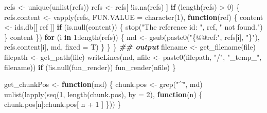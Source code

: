 \documentclass[
]{article}
\newenvironment{Shaded}{\begin{snugshade}}{\end{snugshade}}
\newcommand{\AttributeTok}[1]{\textcolor[rgb]{0.77,0.63,0.00}{#1}}
\newcommand{\ControlFlowTok}[1]{\textcolor[rgb]{0.13,0.29,0.53}{\textbf{#1}}}
\newcommand{\DecValTok}[1]{\textcolor[rgb]{0.00,0.00,0.81}{#1}}
\newcommand{\DocumentationTok}[1]{\textcolor[rgb]{0.56,0.35,0.01}{\textbf{\textit{#1}}}}
\newcommand{\FunctionTok}[1]{\textcolor[rgb]{0.00,0.00,0.00}{#1}}
\newcommand{\NormalTok}[1]{#1}
\newcommand{\OtherTok}[1]{\textcolor[rgb]{0.56,0.35,0.01}{#1}}
\newcommand{\SpecialCharTok}[1]{\textcolor[rgb]{0.00,0.00,0.00}{#1}}
\newcommand{\StringTok}[1]{\textcolor[rgb]{0.31,0.60,0.02}{#1}}
\begin{document}
\begin{Shaded}
\begin{Highlighting}[]
\NormalTok{    refs }\OtherTok{\textless{}{-}} \FunctionTok{unique}\NormalTok{(}\FunctionTok{unlist}\NormalTok{(refs))}
\NormalTok{    refs }\OtherTok{\textless{}{-}}\NormalTok{ refs[ }\SpecialCharTok{!}\FunctionTok{is.na}\NormalTok{(refs) ]}
    \ControlFlowTok{if}\NormalTok{ (}\FunctionTok{length}\NormalTok{(refs) }\SpecialCharTok{\textgreater{}} \DecValTok{0}\NormalTok{) \{}
\NormalTok{      refs.content }\OtherTok{\textless{}{-}} \FunctionTok{vapply}\NormalTok{(refs, }\AttributeTok{FUN.VALUE =} \FunctionTok{character}\NormalTok{(}\DecValTok{1}\NormalTok{),}
        \ControlFlowTok{function}\NormalTok{(ref) \{}
\NormalTok{          content }\OtherTok{\textless{}{-}}\NormalTok{ ids.db[[ ref ]]}
          \ControlFlowTok{if}\NormalTok{ (}\FunctionTok{is.null}\NormalTok{(content)) \{}
            \FunctionTok{stop}\NormalTok{(}\StringTok{"The reference id: "}\NormalTok{, ref, }\StringTok{" not found."}\NormalTok{)}
\NormalTok{          \}}
\NormalTok{          content}
\NormalTok{        \})}
      \ControlFlowTok{for}\NormalTok{ (i }\ControlFlowTok{in} \DecValTok{1}\SpecialCharTok{:}\FunctionTok{length}\NormalTok{(refs)) \{}
\NormalTok{        md }\OtherTok{\textless{}{-}} \FunctionTok{gsub}\NormalTok{(}\FunctionTok{paste0}\NormalTok{(}\StringTok{"\{@@ref:"}\NormalTok{, refs[i], }\StringTok{"\}"}\NormalTok{), refs.content[i], md, }\AttributeTok{fixed =}\NormalTok{ T)}
\NormalTok{      \}}
\NormalTok{    \}}
\NormalTok{  \}}
  \DocumentationTok{\#\# output}
\NormalTok{  filename }\OtherTok{\textless{}{-}} \FunctionTok{get\_filename}\NormalTok{(file)}
\NormalTok{  filepath }\OtherTok{\textless{}{-}} \FunctionTok{get\_path}\NormalTok{(file)}
  \FunctionTok{writeLines}\NormalTok{(md, nfile }\OtherTok{\textless{}{-}} \FunctionTok{paste0}\NormalTok{(filepath, }\StringTok{"/"}\NormalTok{, }\StringTok{"\_temp\_"}\NormalTok{, filename))}
  \ControlFlowTok{if}\NormalTok{ (}\SpecialCharTok{!}\FunctionTok{is.null}\NormalTok{(fun\_render))}
    \FunctionTok{fun\_render}\NormalTok{(nfile)}
\NormalTok{\}}

\NormalTok{get\_chunkPos }\OtherTok{\textless{}{-}} \ControlFlowTok{function}\NormalTok{(md) \{}
\NormalTok{  chunk.pos }\OtherTok{\textless{}{-}} \FunctionTok{grep}\NormalTok{(}\StringTok{"\^{}\textasciigrave{}\textasciigrave{}\textasciigrave{}"}\NormalTok{, md)}
  \FunctionTok{unlist}\NormalTok{(}\FunctionTok{lapply}\NormalTok{(}\FunctionTok{seq}\NormalTok{(}\DecValTok{1}\NormalTok{, }\FunctionTok{length}\NormalTok{(chunk.pos), }\AttributeTok{by =} \DecValTok{2}\NormalTok{),}
      \ControlFlowTok{function}\NormalTok{(n) \{}
\NormalTok{        chunk.pos[n]}\SpecialCharTok{:}\NormalTok{chunk.pos[ n }\SpecialCharTok{+} \DecValTok{1}\NormalTok{ ]}
\NormalTok{      \}))}
\NormalTok{\}}


\end{Highlighting}
\end{Shaded}
\end{document}
